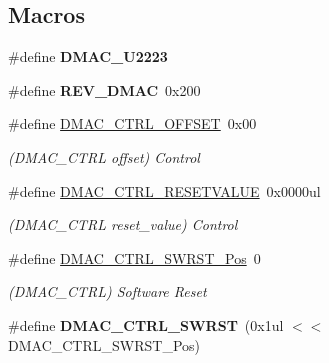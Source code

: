 \subsection*{Macros}
\begin{DoxyCompactItemize}
\item 
\hypertarget{group___s_a_m_l21___d_m_a_c_gaa984c4145bf19e51a88ef9b4bb4f7996}{}\#define {\bfseries D\+M\+A\+C\+\_\+\+U2223}\label{group___s_a_m_l21___d_m_a_c_gaa984c4145bf19e51a88ef9b4bb4f7996}

\item 
\hypertarget{group___s_a_m_l21___d_m_a_c_ga5b6a1637f9f2c1b3d7ab9895b7ee6278}{}\#define {\bfseries R\+E\+V\+\_\+\+D\+M\+A\+C}~0x200\label{group___s_a_m_l21___d_m_a_c_ga5b6a1637f9f2c1b3d7ab9895b7ee6278}

\item 
\hypertarget{group___s_a_m_l21___d_m_a_c_ga645827d59af58171089d84fbbddb7839}{}\#define \hyperlink{group___s_a_m_l21___d_m_a_c_ga645827d59af58171089d84fbbddb7839}{D\+M\+A\+C\+\_\+\+C\+T\+R\+L\+\_\+\+O\+F\+F\+S\+E\+T}~0x00\label{group___s_a_m_l21___d_m_a_c_ga645827d59af58171089d84fbbddb7839}

\begin{DoxyCompactList}\small\item\em (D\+M\+A\+C\+\_\+\+C\+T\+R\+L offset) Control \end{DoxyCompactList}\item 
\hypertarget{group___s_a_m_l21___d_m_a_c_gaa0ef8b3b171e00651cfe40f4884ef7fc}{}\#define \hyperlink{group___s_a_m_l21___d_m_a_c_gaa0ef8b3b171e00651cfe40f4884ef7fc}{D\+M\+A\+C\+\_\+\+C\+T\+R\+L\+\_\+\+R\+E\+S\+E\+T\+V\+A\+L\+U\+E}~0x0000ul\label{group___s_a_m_l21___d_m_a_c_gaa0ef8b3b171e00651cfe40f4884ef7fc}

\begin{DoxyCompactList}\small\item\em (D\+M\+A\+C\+\_\+\+C\+T\+R\+L reset\+\_\+value) Control \end{DoxyCompactList}\item 
\hypertarget{group___s_a_m_l21___d_m_a_c_gafc4408f37ef2a70d53e3e1794ab1b422}{}\#define \hyperlink{group___s_a_m_l21___d_m_a_c_gafc4408f37ef2a70d53e3e1794ab1b422}{D\+M\+A\+C\+\_\+\+C\+T\+R\+L\+\_\+\+S\+W\+R\+S\+T\+\_\+\+Pos}~0\label{group___s_a_m_l21___d_m_a_c_gafc4408f37ef2a70d53e3e1794ab1b422}

\begin{DoxyCompactList}\small\item\em (D\+M\+A\+C\+\_\+\+C\+T\+R\+L) Software Reset \end{DoxyCompactList}\item 
\hypertarget{group___s_a_m_l21___d_m_a_c_ga94ac959fd87d0854a52c6ff1f6e2ec19}{}\#define {\bfseries D\+M\+A\+C\+\_\+\+C\+T\+R\+L\+\_\+\+S\+W\+R\+S\+T}~(0x1ul $<$$<$ D\+M\+A\+C\+\_\+\+C\+T\+R\+L\+\_\+\+S\+W\+R\+S\+T\+\_\+\+Pos)\label{group___s_a_m_l21___d_m_a_c_ga94ac959fd87d0854a52c6ff1f6e2ec19}


\end{DoxyCompactItemize}
